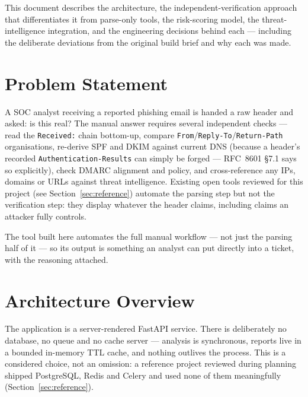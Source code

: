 \documentclass[11pt,a4paper]{article}
\begin{document}
This document describes the architecture, the independent-verification approach that
differentiates it from parse-only tools, the risk-scoring model, the threat-intelligence
integration, and the engineering decisions behind each — including the deliberate
deviations from the original build brief and why each was made.

\section{Problem Statement}

A SOC analyst receiving a reported phishing email is handed a raw header and asked: is this
real? The manual answer requires several independent checks — read the \texttt{Received:}
chain bottom-up, compare \texttt{From}/\texttt{Reply-To}/\texttt{Return-Path} organisations,
re-derive SPF and DKIM against current DNS (because a header's recorded
\texttt{Authentication-Results} can simply be forged — RFC~8601 \S7.1 says so explicitly),
check DMARC alignment and policy, and cross-reference any IPs, domains or URLs against
threat intelligence. Existing open tools reviewed for this project (see
Section~\ref{sec:reference}) automate the parsing step but not the verification step: they
display whatever the header claims, including claims an attacker fully controls.

The tool built here automates the full manual workflow — not just the parsing half of it —
so its output is something an analyst can put directly into a ticket, with the reasoning
attached.

\section{Architecture Overview}

The application is a server-rendered FastAPI service. There is deliberately no database, no
queue and no cache server — analysis is synchronous, reports live in a bounded in-memory TTL
cache, and nothing outlives the process. This is a considered choice, not an omission: a
reference project reviewed during planning shipped PostgreSQL, Redis and Celery and used
none of them meaningfully (Section~\ref{sec:reference}).
\end{document}
